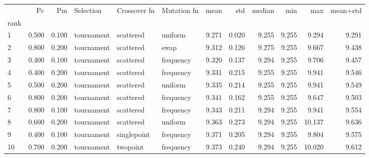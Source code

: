\begin{tabular}{lrrlllrrrrrr}
\toprule
 & Pc & Pm & Selection & Crossover fn & Mutation fn & mean & std & median & min & max & mean+std \\
rank &  &  &  &  &  &  &  &  &  &  &  \\
\midrule
1 & 0.500 & 0.100 & tournament & scattered & uniform & 9.271 & 0.020 & 9.255 & 9.255 & 9.294 & 9.291 \\
2 & 0.800 & 0.200 & tournament & scattered & swap & 9.312 & 0.126 & 9.275 & 9.255 & 9.667 & 9.438 \\
3 & 0.400 & 0.100 & tournament & scattered & frequency & 9.320 & 0.137 & 9.294 & 9.255 & 9.706 & 9.457 \\
4 & 0.400 & 0.200 & tournament & scattered & frequency & 9.331 & 0.215 & 9.255 & 9.255 & 9.941 & 9.546 \\
5 & 0.500 & 0.200 & tournament & scattered & uniform & 9.335 & 0.214 & 9.255 & 9.255 & 9.941 & 9.549 \\
6 & 0.800 & 0.200 & tournament & scattered & frequency & 9.341 & 0.162 & 9.255 & 9.255 & 9.647 & 9.503 \\
7 & 0.800 & 0.100 & tournament & scattered & frequency & 9.343 & 0.211 & 9.294 & 9.255 & 9.941 & 9.554 \\
8 & 0.600 & 0.200 & tournament & scattered & uniform & 9.363 & 0.273 & 9.294 & 9.255 & 10.137 & 9.636 \\
9 & 0.400 & 0.100 & tournament & singlepoint & frequency & 9.371 & 0.205 & 9.294 & 9.255 & 9.804 & 9.575 \\
10 & 0.700 & 0.200 & tournament & twopoint & frequency & 9.373 & 0.240 & 9.294 & 9.255 & 10.020 & 9.612 \\
\bottomrule
\end{tabular}
